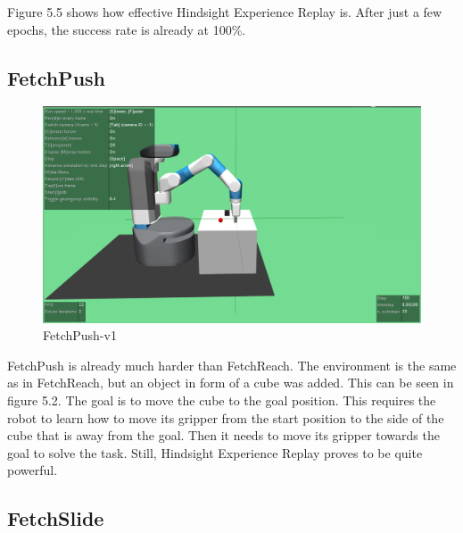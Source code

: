 \vspace{0.5cm}

Figure 5.5 shows how effective Hindsight Experience Replay is.  After just a few epochs, the success rate is already at 100\%.




\subsection{FetchPush}

\begin{figure} [h]
	
	\centering
	\includegraphics[width=1\textwidth]{figures/FetchPush-v1.png}
	\caption{FetchPush-v1}
	
\end{figure}

FetchPush is already much harder than FetchReach. The environment is the same as in FetchReach, but an object in form of a cube was added. This can be seen in figure 5.2. The goal is to move the cube to the goal position. This requires the robot to learn how to move its gripper from the start position to the side of the cube that is away from the goal. Then it needs to move its gripper towards the goal to solve the task. Still, Hindsight Experience Replay proves to be quite powerful. 




\subsection{FetchSlide}

